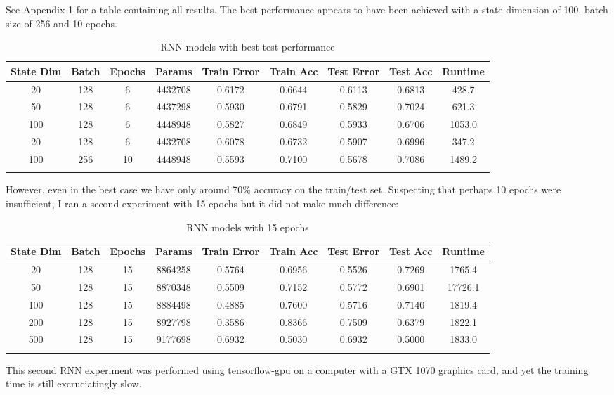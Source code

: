 \documentclass[letterpaper, 10pt]{article}
\begin{document}
See Appendix 1 for a table containing all results.
The best performance appears to have been achieved with a state dimension of 100,
batch size of 256 and 10 epochs.

\begin{longtable}{c | c | c | c | c | c | c | c | c}
State Dim & Batch & Epochs & Params & Train Error & Train Acc & Test Error & Test Acc & Runtime\\
\hline
\endhead
20 & 128 & 6 & 4432708 & 0.6172 & 0.6644 & 0.6113 & 0.6813 & 428.7 \\
50 & 128 & 6 & 4437298 & 0.5930 & 0.6791 & 0.5829 & 0.7024 & 621.3 \\
100 & 128 & 6 & 4448948 & 0.5827 & 0.6849 & 0.5933 & 0.6706 & 1053.0 \\
20 & 128 & 6 & 4432708 & 0.6078 & 0.6732 & 0.5907 & 0.6996 & 347.2 \\
100 & 256 & 10 & 4448948 & 0.5593 & 0.7100 & 0.5678 & 0.7086 & 1489.2 \\
\caption{RNN models with best test performance}
\end{longtable}

\newpage

However, even in the best case we have only around 70\% accuracy on the train/test set.
Suspecting that perhaps 10 epochs were insufficient, I ran a second experiment
with 15 epochs but it did not make much difference:

\begin{longtable}{c | c | c | c | c | c | c | c | c}
State Dim & Batch & Epochs & Params & Train Error & Train Acc & Test Error & Test Acc & Runtime\\
\hline
\endhead
20 & 128 & 15 & 8864258 & 0.5764 & 0.6956 & 0.5526 & 0.7269 & 1765.4 \\
50 & 128 & 15 & 8870348 & 0.5509 & 0.7152 & 0.5772 & 0.6901 & 17726.1 \\
100 & 128 & 15 & 8884498 & 0.4885 & 0.7600 & 0.5716 & 0.7140 & 1819.4 \\
200 & 128 & 15 & 8927798 & 0.3586 & 0.8366 & 0.7509 & 0.6379 & 1822.1 \\
500 & 128 & 15 & 9177698 & 0.6932 & 0.5030 & 0.6932 & 0.5000 & 1833.0 \\
\caption{RNN models with 15 epochs}
\end{longtable}

This second RNN experiment was performed using tensorflow-gpu on a computer with a GTX 1070
graphics card, and yet the training time is still excruciatingly slow.
\end{document}

